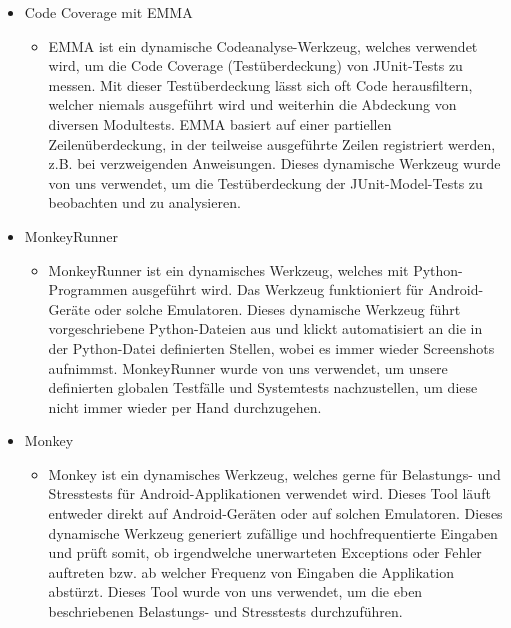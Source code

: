 \begin{itemize}
\item Code Coverage mit EMMA
\begin{itemize} 
\item EMMA ist ein dynamische Codeanalyse-Werkzeug, welches verwendet wird, um die Code Coverage (Testüberdeckung) von JUnit-Tests zu messen.
	Mit dieser Testüberdeckung lässt sich oft  Code herausfiltern, welcher niemals ausgeführt wird und weiterhin die Abdeckung von diversen Modultests.
	EMMA basiert auf einer partiellen Zeilenüberdeckung, in der teilweise ausgeführte Zeilen registriert werden, z.B. bei verzweigenden Anweisungen.
	Dieses dynamische Werkzeug wurde von uns verwendet, um die Testüberdeckung der JUnit-Model-Tests zu beobachten und zu analysieren. 
	\end{itemize}
\end{itemize}

\begin{itemize}
\item MonkeyRunner
\begin{itemize} 
\item MonkeyRunner ist ein dynamisches Werkzeug, welches mit Python-Programmen ausgeführt wird. Das Werkzeug funktioniert für Android-Geräte oder solche Emulatoren.
	Dieses dynamische Werkzeug führt vorgeschriebene Python-Dateien aus und klickt automatisiert an die in der Python-Datei definierten Stellen, wobei es immer wieder Screenshots aufnimmst.
	MonkeyRunner wurde von uns verwendet, um unsere definierten globalen Testfälle und Systemtests nachzustellen, um diese nicht immer wieder per Hand durchzugehen.
	\end{itemize}
\end{itemize}

\begin{itemize}
\item Monkey
\begin{itemize} 
\item Monkey ist ein dynamisches Werkzeug, welches gerne für Belastungs- und Stresstests für Android-Applikationen verwendet wird. Dieses Tool läuft entweder direkt auf Android-Geräten oder auf solchen Emulatoren.
	Dieses dynamische Werkzeug generiert zufällige und hochfrequentierte Eingaben und prüft somit, ob irgendwelche unerwarteten Exceptions oder Fehler auftreten bzw. ab welcher Frequenz von Eingaben die Applikation 	  abstürzt. Dieses Tool wurde von uns verwendet, um die eben beschriebenen Belastungs- und Stresstests durchzuführen.
	\end{itemize}
\end{itemize}